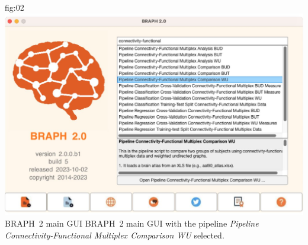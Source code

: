 \documentclass[justified]{tufte-handout}
\begin{document}
	{fig:02}
	{\includegraphics{fig02.jpg}}
	{BRAPH~2 main GUI}
	{
	BRAPH~2 main GUI with the pipeline \emph{Pipeline Connectivity-Functional Multiplex Comparison WU} selected.
	}

\end{document}
